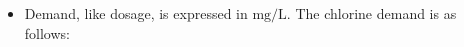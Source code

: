 \begin{itemize}
\item Demand, like dosage, is expressed in $\mathrm{mg} / \mathrm{L}$. The chlorine demand is as follows:

%



%
\end{itemize}

\newpage
